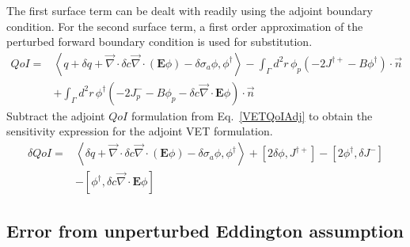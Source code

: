 \documentclass{article}
\newcommand{\bra}{\left\langle}
\newcommand{\ket}{\right\rangle}
\newcommand{\sbra}{\left[}
\newcommand{\sket}{\right]}
\newcommand{\vdiv}{\vec{\nabla} \cdot}
\newcommand{\Edd}{\mathbf{E}}
\newcommand{\siga}{\sigma_a}
\newcommand{\isigt}{c}
\newcommand{\scalSource}{q}
\newcommand{\qoi}{QoI}
\begin{document}
The first surface term can be dealt with readily using the adjoint boundary condition. For the second surface term, a first order approximation of the perturbed forward boundary condition is used for substitution.
\begin{equation}
\label{QoIVETAdj}
\begin{split}
\qoi =& \bra \scalSource + \delta \scalSource + \vdiv \delta \isigt \vdiv \left( \Edd \phi \right) - \delta \siga \phi, \phi^\dag \ket - \int_\Gamma d^2 r \, \phi_p \left( - 2J^{\dag +} - B \phi^\dag \right) \cdot \vec{n} 
\\ &+ \int_\Gamma d^2 r \, \phi^\dag \left( - 2J_p^- - B \phi_p - \delta \isigt \vdiv \Edd \phi \right) \cdot \vec{n} 
\end{split}
\end{equation}
Subtract the adjoint $\qoi$ formulation from Eq.~\eqref{VETQoIAdj} to obtain the sensitivity expression for the adjoint VET formulation.
\begin{equation}
\label{SensVETAdjNoBC}
\begin{split}
\delta \qoi =& \bra \delta \scalSource + \vdiv \delta \isigt \vdiv \left( \Edd \phi \right) - \delta \siga \phi, \phi^\dag \ket + \sbra 2\delta \phi, J^{\dag +} \sket  - \sbra 2\phi^\dag, \delta J^- \sket
\\ &- \sbra \phi^\dag, \delta \isigt \vdiv \Edd \phi \sket
\end{split}
\end{equation}


\subsection{Error from unperturbed Eddington assumption}
\end{document}
